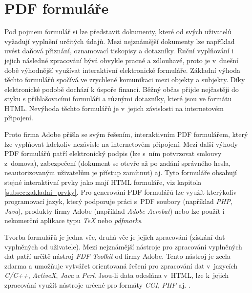\section{PDF formuláře}
Pod pojmem formulář si lze představit dokumenty, které od svých uživatelů vyžadují vyplnění určitých údajů. Mezi nejznámější dokumenty lze například uvést daňová přiznání, oznamovací tiskopisy a dotazníky. Ruční vyplňování i jejich následné zpracování bývá obvykle pracné a zdlouhavé, proto je v~dnešní době výhodnější využívat interaktivní elektronické formuláře. Základní výhoda těchto formulářů spočívá ve zrychlené komunikaci mezi objekty a subjekty. Díky elektronické podobě dochází k úspoře financí. Běžný občas přijde nejčastěji do styku s přihlašovacími formuláři a různými dotazníky, které jsou ve formátu HTML. Nevýhoda těchto formulářů je v~jejich závislosti na internetovém připojení. 
\par
Proto firma Adobe přišla se svým řešením, interaktivním PDF formulářem, který lze vyplňovat kdekoliv nezávisle na internetovém připojení. Mezi další výhody PDF formulářů patří elektronický podpis (lze s~ním potvrzovat smlouvy z~domova), zabezpečení (dokument se otevře až po zadání správného hesla, neautorizovaným uživatelům je přístup zamítnut) aj. Tyto formuláře obsahují stejné interaktivní prvky jako mají HTML formuláře, viz kapitola \ref{subsec:zakladni_prvky}. Pro generování PDF formulářů lze využít kterýkoliv programovací jazyk, který podporuje práci s~PDF soubory (například \textit{PHP}, \textit{Java}), produkty firmy Adobe (například \textit{Adobe Acrobat}) nebo lze použít i nekomerční aplikace typu \textit{TeX} nebo \textit{pdfmarks}.
\par
Tvorba formulářů je jedna věc, druhá věc je jejich zpracování (získání dat vyplněných od uživatele). Mezi nejznámější nástroje pro zpracování vyplněných dat patří určitě nástroj \textit{FDF Toolkit} od firmy Adobe. Tento nástroj je zcela zdarma a umožňuje vytvářet orientovaná řešení pro zpracování dat v~jazycích \textit{C/C++}, \textit{ActiveX}, \textit{Java} a \textit{Perl}. Jsou-li data odeslána v~HTML, lze k~jejich zpracování využít nástroje určené pro formáty \textit{CGI}, \textit{PHP} aj. \cite{PDFForm}.

